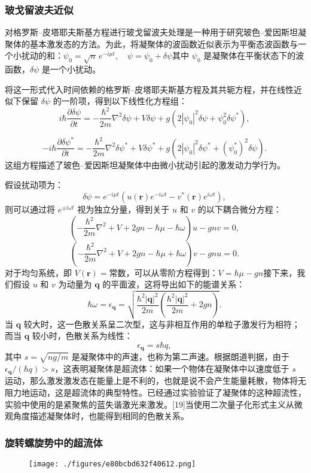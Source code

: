 \subsubsection{玻戈留波夫近似}
对格罗斯–皮塔耶夫斯基方程进行玻戈留波夫处理是一种用于研究玻色–爱因斯坦凝聚体的基本激发态的方法。为此，将凝聚体的波函数近似表示为平衡态波函数与一个小扰动的和：$\psi_0 = \sqrt{n} \, e^{-i\mu t}, \quad \psi = \psi_0 + \delta \psi$其中 $\psi_0$ 是凝聚体在平衡状态下的波函数，$\delta \psi$ 是一个小扰动。

将这一形式代入时间依赖的格罗斯–皮塔耶夫斯基方程及其共轭方程，并在线性近似下保留 $\delta \psi$ 的一阶项，得到以下线性化方程组：
$$
i\hbar \frac{\partial \delta \psi}{\partial t} = -\frac{\hbar^2}{2m} \nabla^2 \delta \psi + V \delta \psi + g \left( 2|\psi_0|^2 \delta \psi + \psi_0^2 \delta \psi^* \right),~
$$

$$
- i\hbar \frac{\partial \delta \psi^*}{\partial t} = -\frac{\hbar^2}{2m} \nabla^2 \delta \psi^* + V \delta \psi^* + g \left( 2|\psi_0|^2 \delta \psi^* + (\psi_0^*)^2 \delta \psi \right).~
$$
这组方程描述了玻色–爱因斯坦凝聚体中由微小扰动引起的激发动力学行为。

假设扰动项为：
$$
\delta \psi = e^{-i\mu t} \left( u(\mathbf{r}) e^{-i\omega t} - v^*(\mathbf{r}) e^{i\omega t} \right),~
$$
则可以通过将 $e^{\pm i\omega t}$ 视为独立分量，得到关于 $u$ 和 $v$ 的以下耦合微分方程：
$$
\left( -\frac{\hbar^2}{2m} \nabla^2 + V + 2gn - \hbar \mu - \hbar \omega \right) u - gn v = 0,~
$$
$$
\left( -\frac{\hbar^2}{2m} \nabla^2 + V + 2gn - \hbar \mu + \hbar \omega \right) v - gn u = 0.~
$$
对于均匀系统，即 $V(\mathbf{r}) = \text{常数}$，可以从零阶方程得到：$V = \hbar \mu - gn$接下来，我们假设 $u$ 和 $v$ 为动量为 $\mathbf{q}$ 的平面波，这将导出如下的能谱关系：
$$
\hbar \omega = \epsilon_{\mathbf{q}} = \sqrt{ \frac{\hbar^2 |\mathbf{q}|^2}{2m} \left( \frac{\hbar^2 |\mathbf{q}|^2}{2m} + 2gn \right) }.~
$$
当 $\mathbf{q}$ 较大时，这一色散关系呈二次型，这与非相互作用的单粒子激发行为相符；而当 $\mathbf{q}$ 较小时，色散关系为线性：
$$
\epsilon_{\mathbf{q}} = s \hbar q,~
$$
其中 $s = \sqrt{ng/m}$ 是凝聚体中的声速，也称为第二声速。根据朗道判据，由于 $\epsilon_{\mathbf{q}} / (\hbar q) > s$，这表明凝聚体是超流体：如果一个物体在凝聚体中以速度低于 $s$ 运动，那么激发激发态在能量上是不利的，也就是说不会产生能量耗散，物体将无阻力地运动，这是超流体的典型特性。已经通过实验验证了凝聚体的这种超流性，实验中使用的是紧聚焦的蓝失谐激光来激发。[19]当使用二次量子化形式主义从微观角度描述凝聚体时，也能得到相同的色散关系。
\subsubsection{旋转螺旋势中的超流体}
\begin{figure}[ht]
\centering
\texttt{[image: ./figures/e80bcbd632f40612.png]}
\caption{} \label{fig_GLS_1}
\end{figure}